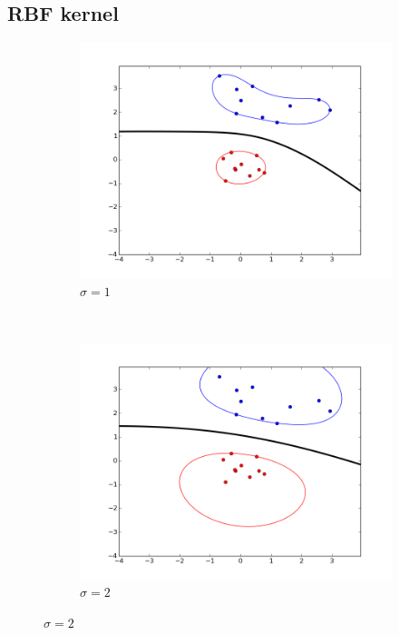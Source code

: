\documentclass{article}
\begin{document}
\subsection{RBF kernel}
\begin{figure}[!h]
    \centering
    \begin{subfigure}[b]{0.3\textwidth}
        \includegraphics[width=1.2\textwidth]{images/rbf/1/figure_1.png}
        \caption{$\sigma = 1$} \label{rbf_1_figure_1}
    \end{subfigure}
    ~ 
    \begin{subfigure}[b]{0.3\textwidth}
        \includegraphics[width=1.2\textwidth]{images/rbf/1/figure_2.png}
        \caption{$\sigma = 2$}  \label{rbf_1_figure_2}

\end{subfigure}
\end{figure}
\end{document}
